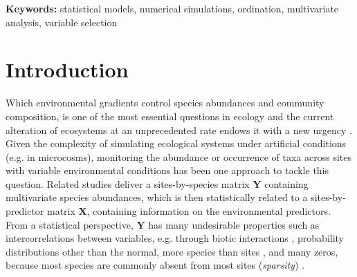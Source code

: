 \documentclass[a4paper,11pt]{article}
\begin{document}

        {\bf Keywords:} 
        statistical models,
        numerical simulations,
        ordination, 
        multivariate analysis, 
        variable selection
    \newpage

\newpage

\section{Introduction}


	Which environmental gradients control species abundances and community composition, is one of the most essential questions in ecology \citep[e.g.][]{Clements1907}  and the current alteration of ecosystems at an unprecedented rate endows it with a new urgency \citep{pacifici2015assessing}. 
	Given the complexity of simulating ecological systems under artificial conditions (e.g. in microcosms), monitoring the abundance or occurrence of taxa across sites with variable  environmental conditions has been one approach to tackle this question.
	Related studies deliver a sites-by-species matrix $\mathbf{Y}$ containing multivariate species abundances, which is then statistically related to  a sites-by-predictor matrix $\mathbf{X}$, containing information on the environmental predictors.
	From a statistical perspective, $\mathbf{Y}$ has many undesirable properties such as
	intercorrelations between variables, 
	e.g. through biotic interactions \citep{morales2015inferring},
	probability distributions other than the normal, 
	more species than sites \citep[\textit{high dimensionality}, especially in DNA barcoding studies, ][]{cristescu2014barcoding},  
	and many zeros, because most species are commonly absent from most sites (\textit{sparsity}) \citep{mcgill2007species}. 
	
    
\end{document}
